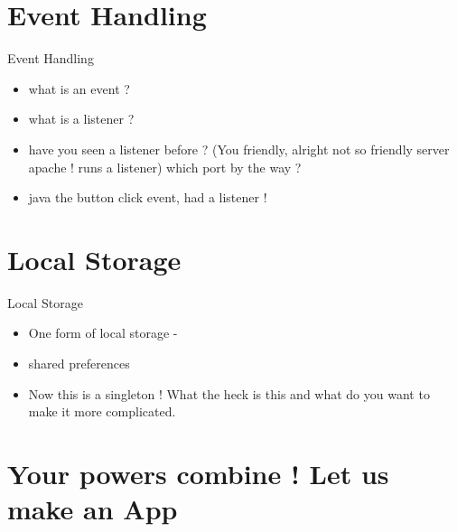 \documentclass[11pt]{beamer}
\begin{document}
\section{Event Handling}
\begin{frame}[containsverbatim]{Event Handling}
	\begin{flushleft}
	\begin{itemize}
		\item what is an event ?
		\item what is a listener ?
		\item have you seen a listener before ? (You friendly, alright not so friendly server apache ! runs a listener) which port by the way ?
		\item java the button click event, had a listener !
	\end{itemize}
	\end{flushleft}
\end{frame}

\section{Local Storage}
\begin{frame}[containsverbatim]{Local Storage}
	\begin{flushleft}
	\begin{itemize}
		\item One form of local storage - 
		\item shared preferences
		\item Now this is a singleton ! What the heck is this and what do you want to make it more complicated.

	\end{itemize}
	\end{flushleft}
\end{frame}
\section{Your powers combine ! Let us make an App}
\end{document}
